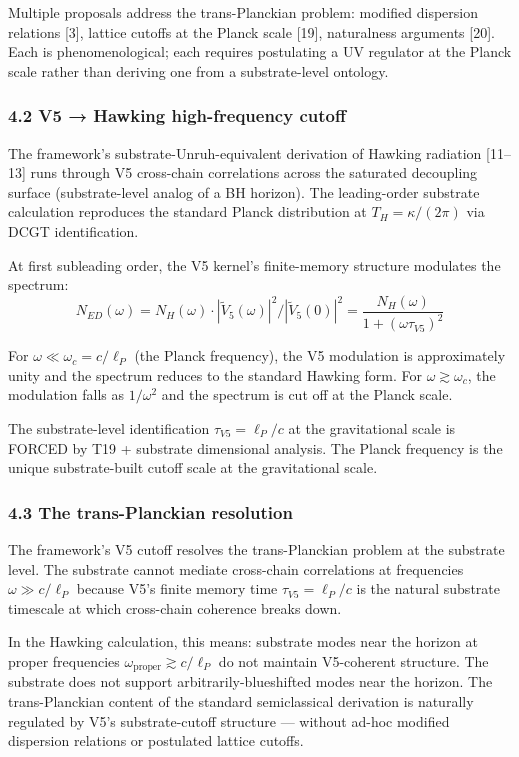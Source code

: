 \documentclass[
  11pt,
  a4paperpaper,
]{article}
\begin{document}
Multiple proposals address the trans-Planckian problem: modified
dispersion relations {[}3{]}, lattice cutoffs at the Planck scale
{[}19{]}, naturalness arguments {[}20{]}. Each is phenomenological; each
requires postulating a UV regulator at the Planck scale rather than
deriving one from a substrate-level ontology.

\subsubsection{4.2 V5 → Hawking high-frequency
cutoff}\label{v5-hawking-high-frequency-cutoff}

The framework's substrate-Unruh-equivalent derivation of Hawking
radiation {[}11--13{]} runs through V5 cross-chain correlations across
the saturated decoupling surface (substrate-level analog of a BH
horizon). The leading-order substrate calculation reproduces the
standard Planck distribution at \(T_H = \kappa/(2\pi)\) via DCGT
identification.

At first subleading order, the V5 kernel's finite-memory structure
modulates the spectrum:
\[N_{ED}(\omega) = N_H(\omega) \cdot |\tilde V_5(\omega)|^2 / |\tilde V_5(0)|^2 = \frac{N_H(\omega)}{1 + (\omega\tau_{V5})^2}\]

For \(\omega \ll \omega_c = c/\ell_P\) (the Planck frequency), the V5
modulation is approximately unity and the spectrum reduces to the
standard Hawking form. For \(\omega \gtrsim \omega_c\), the modulation
falls as \(1/\omega^2\) and the spectrum is cut off at the Planck scale.

The substrate-level identification \(\tau_{V5} = \ell_P/c\) at the
gravitational scale is FORCED by T19 + substrate dimensional analysis.
The Planck frequency is the unique substrate-built cutoff scale at the
gravitational scale.

\subsubsection{4.3 The trans-Planckian
resolution}\label{the-trans-planckian-resolution}

The framework's V5 cutoff resolves the trans-Planckian problem at the
substrate level. The substrate cannot mediate cross-chain correlations
at frequencies \(\omega \gg c/\ell_P\) because V5's finite memory time
\(\tau_{V5} = \ell_P/c\) is the natural substrate timescale at which
cross-chain coherence breaks down.

In the Hawking calculation, this means: substrate modes near the horizon
at proper frequencies \(\omega_{\mathrm{proper}} \gtrsim c/\ell_P\) do
not maintain V5-coherent structure. The substrate does not support
arbitrarily-blueshifted modes near the horizon. The trans-Planckian
content of the standard semiclassical derivation is naturally regulated
by V5's substrate-cutoff structure --- without ad-hoc modified
dispersion relations or postulated lattice cutoffs.
\end{document}
